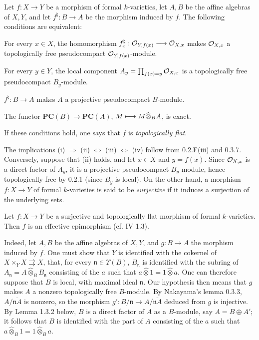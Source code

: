 \begin{lemma}{}
Let $f:X\to Y$ be a morphism of formal $k$-varieties, let $A,B$ be the affine algebras of $X,Y$, and let $f^\natural:B\to A$ be the morphism induced by $f$. The following conditions are equivalent:
\begin{enumeratei}
\item For every $x\in X$, the homomorphism $f_x^\natural:\mathcal{O}_{Y,f(x)}\longrightarrow\mathcal{O}_{X,x}$ makes $\mathcal{O}_{X,x}$ a topologically free pseudocompact $\mathcal{O}_{Y,f(x)}$-module.
\item For every $y\in Y$, the local component $A_y=\prod_{f(x)=y}\mathcal{O}_{X,x}$ is a topologically free pseudocompact $B_y$-module.
\item $f^\natural:B\to A$ makes $A$ a projective pseudocompact $B$-module.
\item The functor $\mathbf{PC}(B)\to\mathbf{PC}(A)$, $M\longmapsto M\widehat\otimes_B A$, is exact.
\end{enumeratei}
If these conditions hold, one says that $f$ is \emph{topologically flat}.
\end{lemma}
The implications (i) $\Rightarrow$ (ii) $\Leftrightarrow$ (iii) $\Leftrightarrow$ (iv) follow from 0.2.F(iii) and 0.3.7. Conversely, suppose that (ii) holds, and let $x\in X$ and $y=f(x)$. Since $\mathcal{O}_{X,x}$ is a direct factor of $A_y$, it is a projective pseudocompact $B_y$-module, hence topologically free by 0.2.1 (since $B_y$ is local).
On the other hand, a morphism $f:X\to Y$ of formal $k$-varieties is said to be \emph{surjective} if it induces a surjection of the underlying sets.
\begin{proposition}{}
Let $f:X\to Y$ be a surjective and topologically flat morphism of formal $k$-varieties. Then $f$ is an effective epimorphism (cf. IV 1.3).
\end{proposition}
Indeed, let $A,B$ be the affine algebras of $X,Y$, and $g:B\to A$ the morphism induced by $f$. One must show that $Y$ is identified with the cokernel of $X\times_Y X\rightrightarrows X$, \ie that, for every $\mathfrak n\in\Upsilon(B)$, $B_{\mathfrak n}$ is identified with the subring of $A_{\mathfrak n}=A\widehat\otimes_B B_{\mathfrak n}$ consisting of the $a$ such that $a\widehat\otimes1=1\widehat\otimes a$.
One can therefore suppose that $B$ is local, with maximal ideal $\mathfrak n$. Our hypothesis then means that $g$ makes $A$ a nonzero topologically free $B$-module. By Nakayama's lemma 0.3.3, $A/\overline{\mathfrak nA}$ is nonzero, so the morphism $g':B/\mathfrak n\to A/\overline{\mathfrak nA}$ deduced from $g$ is injective. By Lemma 1.3.2 below, $B$ is a direct factor of $A$ as a $B$-module, say $A=B\oplus A'$; it follows that $B$ is identified with the part of $A$ consisting of the $a$ such that $a\widehat\otimes_B1=1\widehat\otimes_B a$.

